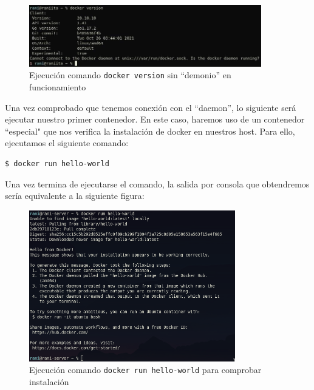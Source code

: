 \documentclass[a4paper, oneside, 12pt]{book}
\begin{document}
	\begin{figure}[h]
		\begin{center}
			\includegraphics[width=0.9\textwidth]{img/docker_version.jpg}
			\caption{Ejecución comando \texttt{docker version} sin ``demonio'' en funcionamiento}
			\label{img: docker version}
		\end{center}
	\end{figure}

	\pagebreak
	
	\noindent Una vez comprobado que tenemos conexión con el ``daemon'', lo siguiente será ejecutar nuestro primer contenedor. En este caso, haremos uso de un contenedor ``especial" que nos verifica la instalación de docker en nuestros host. Para ello, ejecutamos el siguiente comando:
	\begin{verbatim}
$ docker run hello-world
	\end{verbatim}

	\noindent Una vez termina de ejecutarse el comando, la salida por consola que obtendremos sería equivalente a la siguiente figura:
	
	\begin{figure}[h]
		\begin{center}
			\includegraphics[width=0.8\textwidth]{img/docker_hello-world.png}
			\caption{Ejecución comando \texttt{docker run hello-world} para comprobar instalación}
			\label{img: docker hello world}
		\end{center}
	\end{figure}
\end{document}
